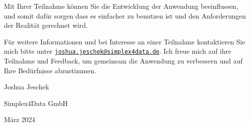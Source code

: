 Mit Ihrer Teilnahme können Sie die Entwicklung der Anwendung beeinflussen, und somit dafür sorgen
dass es einfacher zu benutzen ist und den Anforderungen der Realität gerechnet wird.

Für weitere Informationen und bei Interesse an einer Teilnahme kontaktieren Sie mich bitte unter
\texttt{\href{mailto:joshua.jeschek@simplex4data.de}{joshua.jeschek@simplex4data.de}}. Ich freue mich auf
ihre Teilnahme und Feedback, um gemeinsam die Anwendung zu verbessern und auf Ihre Bedürfnisse
abzustimmen.

\begin{flushright}
  Joshua Jeschek

  Simplex4Data GmbH

  März 2024
\end{flushright}
